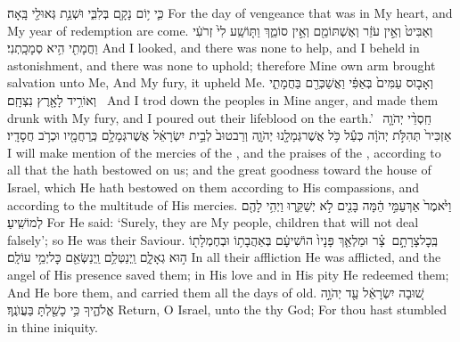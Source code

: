 {כִּ֛י י֥וֹם נָקָ֖ם בְּלִבִּ֑י וּשְׁנַ֥ת גְּאוּלַ֖י בָּֽאָה׃}
{For the day of vengeance that was in My heart, and My year of redemption are come.}
{וְאַבִּיט֙ וְאֵ֣ין עֹזֵ֔ר וְאֶשְׁתּוֹמֵ֖ם וְאֵ֣ין סוֹמֵ֑ךְ וַתּ֤וֹשַֽׁע לִי֙ זְרֹעִ֔י וַחֲמָתִ֖י הִ֥יא סְמָכָֽתְנִי׃}
{And I looked, and there was none to help, and I beheld in astonishment, and there was none to uphold; therefore Mine own arm brought salvation unto Me, And My fury, it upheld Me.}
{וְאָב֤וּס עַמִּים֙ בְּאַפִּ֔י וַאֲשַׁכְּרֵ֖ם בַּחֲמָתִ֑י וְאוֹרִ֥יד לָאָ֖רֶץ נִצְחָֽם׃ \setuma }
{And I trod down the peoples in Mine anger, and made them drunk with My fury, and I poured out their lifeblood on the earth.’}
{חַֽסְדֵ֨י יְהֹוָ֤ה \pasek  אַזְכִּיר֙ תְּהִלֹּ֣ת יְהֹוָ֔ה כְּעַ֕ל כֹּ֥ל אֲשֶׁר\maqqaf גְּמָלָ֖נוּ יְהֹוָ֑ה וְרַב\maqqaf טוּב֙ לְבֵ֣ית יִשְׂרָאֵ֔ל אֲשֶׁר\maqqaf גְּמָלָ֥ם כְּֽרַחֲמָ֖יו וּכְרֹ֥ב חֲסָדָֽיו׃}
{I will make mention of the mercies of the \lord, and the praises of the \lord, according to all that the \lord\space hath bestowed on us; and the great goodness toward the house of Israel, which He hath bestowed on them according to His compassions, and according to the multitude of His mercies.}
{וַיֹּ֙אמֶר֙ אַךְ\maqqaf עַמִּ֣י הֵ֔מָּה בָּנִ֖ים לֹ֣א יְשַׁקֵּ֑רוּ וַיְהִ֥י לָהֶ֖ם לְמוֹשִֽׁיעַ׃}
{For He said: ‘Surely, they are My people, children that will not deal falsely’; so He was their Saviour.}
{בְּֽכׇל\maqqaf צָרָתָ֣ם \legarmeh  {} צָ֗ר וּמַלְאַ֤ךְ פָּנָיו֙ הוֹשִׁיעָ֔ם בְּאַהֲבָת֥וֹ וּבְחֶמְלָת֖וֹ ה֣וּא גְאָלָ֑ם וַֽיְנַטְּלֵ֥ם וַֽיְנַשְּׂאֵ֖ם כׇּל\maqqaf יְמֵ֥י עוֹלָֽם׃}
{In all their affliction He was afflicted, and the angel of His presence saved them; in His love and in His pity He redeemed them; And He bore them, and carried them all the days of old.}
\newperek
{}
\label{haft_52}
\setcounter{chap}{14}
\setcounter{verse}{2}
{שׁ֚וּבָה יִשְׂרָאֵ֔ל עַ֖ד יְהֹוָ֣ה אֱלֹהֶ֑יךָ כִּ֥י כָשַׁ֖לְתָּ בַּעֲוֺנֶֽךָ׃}
{Return, O Israel, unto the \lord\space thy God; For thou hast stumbled in thine iniquity.}
